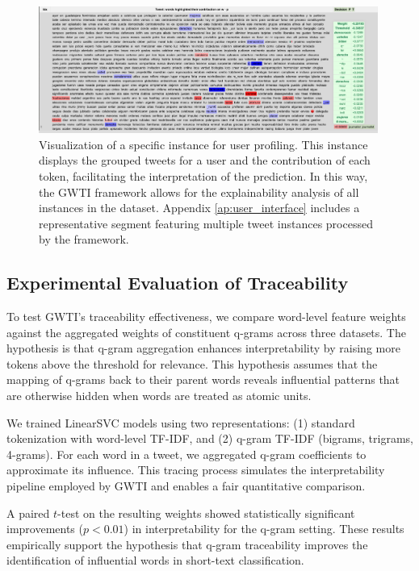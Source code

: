 \documentclass[runningheads,10pt]{llncs}
\begin{document}
\begin{figure}[h]
  \centering
  \includegraphics[width=0.99\textwidth]{user_profile_instance.png}
  \caption{Visualization of a specific instance for user profiling. This instance displays the grouped tweets for a user and the contribution of each token, facilitating the interpretation of the prediction. In this way, the \ac{GWTI} framework allows for the explainability analysis of all instances in the dataset. Appendix \ref{ap:user_interface} includes a representative segment featuring multiple tweet instances processed by the framework.}
  \label{fig:profile_instance}
\end{figure}

\subsection{Experimental Evaluation of Traceability}
To test \ac{GWTI}’s traceability effectiveness, we compare word-level feature weights against the aggregated weights of constituent q-grams across three datasets. The hypothesis is that q-gram aggregation enhances interpretability by raising more tokens above the threshold for relevance. This hypothesis assumes that the mapping of q-grams back to their parent words reveals influential patterns that are otherwise hidden when words are treated as atomic units.

We trained LinearSVC models using two representations: (1) standard tokenization with word-level TF-IDF, and (2) q-gram TF-IDF (bigrams, trigrams, 4-grams). For each word in a tweet, we aggregated q-gram coefficients to approximate its influence. This tracing process simulates the interpretability pipeline employed by \ac{GWTI} and enables a fair quantitative comparison.

A paired $t$-test on the resulting weights showed statistically significant improvements ($p < 0.01$) in interpretability for the q-gram setting. These results empirically support the hypothesis that q-gram traceability improves the identification of influential words in short-text classification.
\end{document}

